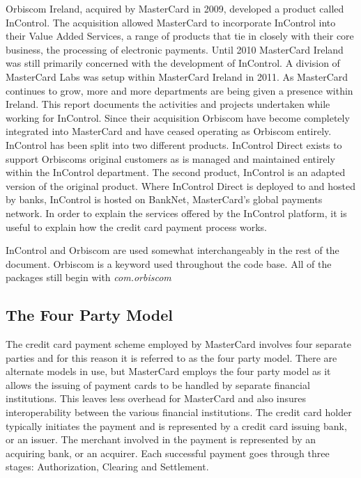 \documentclass[a4paper, 11pt, titlepage]{article}
\begin{document}
Orbiscom Ireland, acquired by MasterCard in 2009, developed a product called InControl. The acquisition allowed MasterCard to incorporate InControl into their Value Added Services, a range of products that tie in closely with their core business, the processing of electronic payments. Until 2010 MasterCard Ireland was still primarily concerned with the development of InControl. A division of MasterCard Labs was setup within MasterCard Ireland in 2011. As MasterCard continues to grow, more and more departments are being given a presence within Ireland. This report documents the activities and projects undertaken while working for InControl. Since their acquisition Orbiscom have become completely integrated into MasterCard and have ceased operating as Orbiscom entirely. InControl has been split into two different products. InControl Direct exists to support Orbiscoms original customers as is managed and maintained entirely within the InControl department. The second product, InControl is an adapted version of the original product. Where InControl Direct is deployed to and hosted by banks, InControl is hosted on BankNet, MasterCard’s global payments network. In order to explain the services offered by the InControl platform, it is useful to explain how the credit card payment process works. 
 
InControl and Orbiscom are used somewhat interchangeably in the rest of the document. Orbiscom is a keyword used throughout the code base. All of the packages still begin with \textit{com.orbiscom} 
 
\subsection{The Four Party Model} 
The credit card payment scheme employed by MasterCard involves four separate parties and for this reason it is referred to as the four party model. There are alternate models in use, but MasterCard employs the four party model as it allows the issuing of payment cards to be handled by separate financial institutions. This leaves less overhead for MasterCard and also insures interoperability between the various financial institutions. The credit card holder typically initiates the payment and is represented by a credit card issuing bank, or an issuer. The merchant involved in the payment is represented by an acquiring bank, or an acquirer. Each successful payment goes through three stages: Authorization, Clearing and Settlement. 
\end{document}
